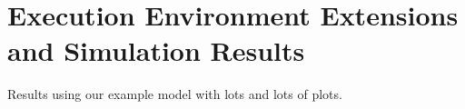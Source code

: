 \section{Execution Environment Extensions and Simulation Results}
\label{section:exec}

Results using our example model with lots and lots of plots.